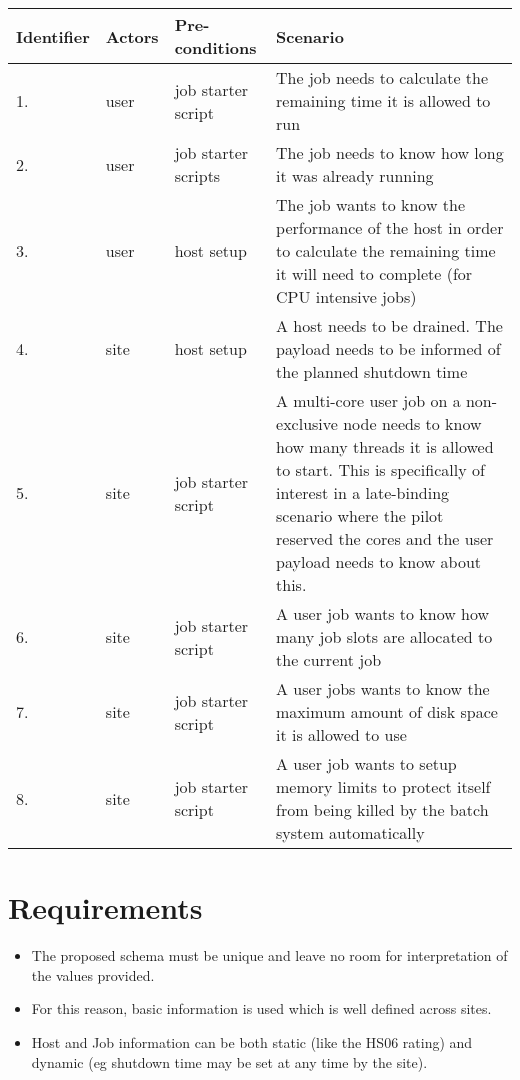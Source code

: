 \documentclass[12pt,a4paper]{article}
\begin{document}
\begin{tabular}{l l l p{5cm}}
Identifier & Actors & Pre-conditions & Scenario \\
\hline
1.	& user	& job starter script	& The job needs to calculate the remaining time it is allowed to run	 	  \\
2.	& user	& job starter scripts	& The job needs to know how long it was already running	 	  \\
3.	& user	& host setup		& The job wants to know the performance of the host in order to calculate the remaining time it will need to complete (for CPU intensive jobs)	 	  \\
4.	& site	& host setup		& A host needs to be drained. The payload needs to be informed of the planned shutdown time	 	  \\
5.	& site	& job starter script	& A multi-core user job on a non-exclusive node needs to know how many threads it is allowed to start. This is specifically of interest in a late-binding scenario where the pilot reserved the cores and the user payload needs to know about this.	  \\
6.	& site	& job starter script	& A user job wants to know how many job slots are allocated to the current job	  \\
7.	& site	& job starter script	& A user jobs wants to know the maximum amount of disk space it is allowed to use	  \\
8.	& site	& job starter script	& A user job wants to setup memory limits to protect itself from being killed by the batch system automatically	  \\
\end{tabular}

\section{Requirements}
\label{sec:Requirements}

\begin{itemize}
\item The proposed schema must be unique and leave no room for interpretation of the values provided.
\item For this reason, basic information is used which is well defined across sites.
\item Host and Job information can be both static (like the HS06 rating) and dynamic (eg shutdown time may be set at any time by the site).
\end{itemize}
\end{document}
